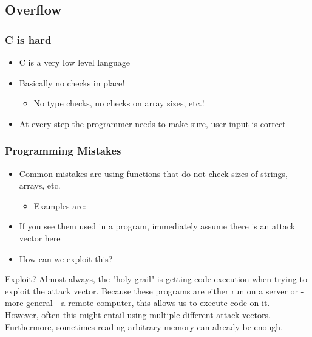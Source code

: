 \documentclass[aspectratio=169]{beamer}
\begin{document}
\subsection{Overflow}
\begin{frame}
    \frametitle{C is hard}
    \begin{itemize}
        \item C is a very low level language
        \item Basically no checks in place!
        \begin{itemize}
            \item No type checks, no checks on array sizes, etc.!
        \end{itemize}
        \item At every step the programmer needs to make sure, user input is correct
    \end{itemize}
\end{frame}
\begin{frame}[fragile]
    \frametitle{Programming Mistakes}
    \begin{itemize}
        \item Common mistakes are using functions that do not check sizes of strings, arrays, etc.
        \begin{itemize}
            \item Examples are: 
        \end{itemize}
        \item If you see them used in a program, immediately assume there is an attack vector here
        \item How can we exploit this?
    \end{itemize}
    \begin{alertblock}{Exploit?}
        Almost always, the "holy grail" is getting code execution when trying to exploit the attack vector.
        Because these programs are either run on a server or - more general - a remote computer, this allows us to execute code on it.\\
        However, often this might entail using multiple different attack vectors.
        Furthermore, sometimes reading arbitrary memory can already be enough.
    \end{alertblock}
\end{frame}
\end{document}
